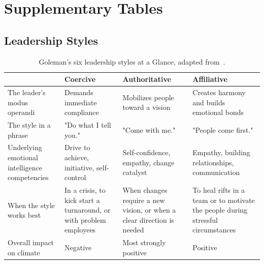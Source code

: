 \chapter{Supplementary Tables}
\label{app:tables}

\section{Leadership Styles}

\begin{table}[htbp]
  \centering
  \small
  \caption{Goleman's six leadership styles at a Glance, adapted from~\cite[p.~82]{goleman2000leadership}.}
  \label{tab:goleman-styles}
  \begin{tabular}{>{\raggedright\arraybackslash}p{4cm} >{\raggedright\arraybackslash}p{4.5cm} >{\raggedright\arraybackslash}p{4.5cm} >{\raggedright\arraybackslash}p{4.5cm}}
    \toprule
     & \textbf{Coercive} & \textbf{Authoritative} & \textbf{Affiliative} \\
    \midrule
    The leader's modus operandi & Demands immediate compliance & Mobilizes people toward a vision & Creates harmony and builds emotional bonds \\
    \midrule
    The style in a phrase & "Do what I tell you." & "Come with me." & "People come first." \\
    \midrule
    Underlying emotional intelligence competencies & Drive to achieve, initiative, self-control & Self-confidence, empathy, change catalyst & Empathy, building relationships, communication \\
    \midrule
    When the style works best & In a crisis, to kick start a turnaround, or with problem employees & When changes require a new vision, or when a clear direction is needed & To heal rifts in a team or to motivate the people during stressful circumstances \\
    \midrule
    Overall impact on climate & Negative & Most strongly positive & Positive \\
    \midrule
  \end{tabular}


\end{table}
